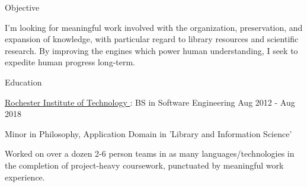 \documentclass{resume} %
\begin{document}

  \begin{rSection}{Objective}

    I'm looking for meaningful work involved with the organization, preservation, and expansion of knowledge, with particular regard to library resources and scientific research. By improving the engines which power human understanding, I seek to expedite human progress long-term.

  \end{rSection}


  \begin{rSection}{Education}

    \begin{rSubsection}{\underline{Rochester Institute of Technology }: BS in Software Engineering }{ Aug 2012 - Aug 2018 }{}

      \item Minor in Philosophy, Application Domain in 'Library and Information Science'

      \item Worked on over a dozen 2-6 person teams in as many languages/technologies in the completion of project-heavy coursework, punctuated by meaningful work experience.

    \end{rSubsection}

  \end{rSection}

\end{document}
